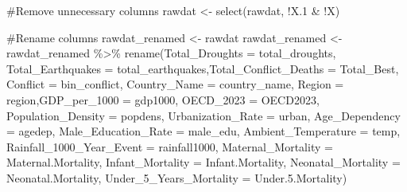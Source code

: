 \documentclass[
  letterpaper,
  DIV=11,
  numbers=noendperiod]{scrartcl}
\newenvironment{Shaded}{\begin{snugshade}}{\end{snugshade}}
\newcommand{\AttributeTok}[1]{\textcolor[rgb]{0.40,0.45,0.13}{#1}}
\newcommand{\CommentTok}[1]{\textcolor[rgb]{0.37,0.37,0.37}{#1}}
\newcommand{\FloatTok}[1]{\textcolor[rgb]{0.68,0.00,0.00}{#1}}
\newcommand{\FunctionTok}[1]{\textcolor[rgb]{0.28,0.35,0.67}{#1}}
\newcommand{\NormalTok}[1]{\textcolor[rgb]{0.00,0.23,0.31}{#1}}
\newcommand{\OtherTok}[1]{\textcolor[rgb]{0.00,0.23,0.31}{#1}}
\newcommand{\SpecialCharTok}[1]{\textcolor[rgb]{0.37,0.37,0.37}{#1}}
\begin{document}
\begin{Shaded}
\begin{Highlighting}[]
\CommentTok{\#Remove unnecessary columns}
\NormalTok{rawdat }\OtherTok{\textless{}{-}} \FunctionTok{select}\NormalTok{(rawdat, }\SpecialCharTok{!}\NormalTok{X}\FloatTok{.1} \SpecialCharTok{\&} \SpecialCharTok{!}\NormalTok{X)}
  
  
\CommentTok{\#Rename columns}
\NormalTok{rawdat\_renamed }\OtherTok{\textless{}{-}}\NormalTok{ rawdat}
\NormalTok{rawdat\_renamed }\OtherTok{\textless{}{-}}\NormalTok{ rawdat\_renamed }\SpecialCharTok{\%\textgreater{}\%} \FunctionTok{rename}\NormalTok{(}\AttributeTok{Total\_Droughts =}\NormalTok{ total\_droughts, }\AttributeTok{Total\_Earthquakes =}\NormalTok{ total\_earthquakes,}\AttributeTok{Total\_Conflict\_Deaths =}\NormalTok{ Total\_Best, }\AttributeTok{Conflict =}\NormalTok{ bin\_conflict, }
                                     \AttributeTok{Country\_Name =}\NormalTok{ country\_name, }\AttributeTok{Region =}\NormalTok{ region,}\AttributeTok{GDP\_per\_1000 =}\NormalTok{ gdp1000, }\AttributeTok{OECD\_2023 =}\NormalTok{ OECD2023, }\AttributeTok{Population\_Density =}\NormalTok{ popdens, }\AttributeTok{Urbanization\_Rate =}\NormalTok{ urban,}
                                     \AttributeTok{Age\_Dependency =}\NormalTok{ agedep, }\AttributeTok{Male\_Education\_Rate =}\NormalTok{ male\_edu, }\AttributeTok{Ambient\_Temperature =}\NormalTok{ temp, }\AttributeTok{Rainfall\_1000\_Year\_Event =}\NormalTok{ rainfall1000, }
                                    \AttributeTok{Maternal\_Mortality =}\NormalTok{ Maternal.Mortality, }\AttributeTok{Infant\_Mortality =}\NormalTok{ Infant.Mortality, }\AttributeTok{Neonatal\_Mortality =}\NormalTok{ Neonatal.Mortality, }\AttributeTok{Under\_5\_Years\_Mortality =}\NormalTok{ Under.}\FloatTok{5.}\NormalTok{Mortality)}


\end{Highlighting}
\end{Shaded}
\end{document}
